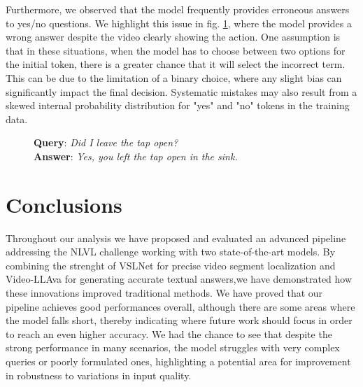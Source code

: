 \documentclass[10pt,twocolumn,letterpaper]{article}
\begin{document}
Furthermore, we observed that the model frequently provides erroneous answers to yes/no questions. We highlight this issue in fig. \ref{fig:animation3}, where the model provides a wrong answer despite the video clearly showing the action. One assumption is that in these situations, when the model has to choose between two options for the initial token, there is a greater chance that it will select the incorrect term. This can be due to the limitation of a binary choice, where any slight bias can significantly impact the final decision. Systematic mistakes may also result from a skewed internal probability distribution for "yes" and "no" tokens in the training data.

\begin{figure}[ht]
  \centering
  \captionsetup{justification=centering} %
      \caption{\textbf{Query}: \textit{Did I leave the tap open?} \\\textbf{Answer}: \textit{Yes, you left the tap open in the sink.}}
  \label{fig:animation3}
\end{figure}

\section{Conclusions}
Throughout our analysis we have proposed and evaluated an advanced pipeline addressing the NLVL challenge working with two state-of-the-art models. By combining the strenght of VSLNet for precise video segment localization and Video-LLAva for generating accurate textual answers,we have demonstrated how these innovations improved traditional methods.
We have proved that our pipeline achieves good performances overall, although there are some areas where the model falls short, thereby indicating where future work should focus in order to reach an even higher accuracy.
We had the chance to see that despite the strong performance in many scenarios, the model struggles with very complex queries or poorly formulated ones, highlighting a potential area for improvement in robustness to variations in input quality.

{\small


}
\end{document}
